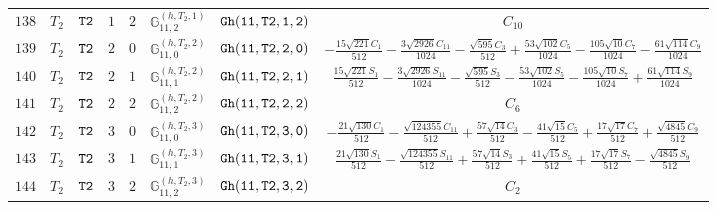 \documentclass[fleqn,8pt]{jsarticle}
\begin{document}
\begin{table}[ht!]
\begin{center}
\begin{tabular}{cccccccc}
$ 138 $ & $ T_{2} $ & $ {\tt T2} $ & $ 1 $ & $ 2 $ & $ \mathbb{G}_{11,2}^{(h,T_{2},1)} $ & $ {\tt Gh(11,T2,1,2)} $ & $ C_{10} $ \\
$ 139 $ & $ T_{2} $ & $ {\tt T2} $ & $ 2 $ & $ 0 $ & $ \mathbb{G}_{11,0}^{(h,T_{2},2)} $ & $ {\tt Gh(11,T2,2,0)} $ & $ - \frac{15 \sqrt{221} C_{1}}{512} - \frac{3 \sqrt{2926} C_{11}}{1024} - \frac{\sqrt{595} C_{3}}{512} + \frac{53 \sqrt{102} C_{5}}{1024} - \frac{105 \sqrt{10} C_{7}}{1024} - \frac{61 \sqrt{114} C_{9}}{1024} $ \\
$ 140 $ & $ T_{2} $ & $ {\tt T2} $ & $ 2 $ & $ 1 $ & $ \mathbb{G}_{11,1}^{(h,T_{2},2)} $ & $ {\tt Gh(11,T2,2,1)} $ & $ \frac{15 \sqrt{221} S_{1}}{512} - \frac{3 \sqrt{2926} S_{11}}{1024} - \frac{\sqrt{595} S_{3}}{512} - \frac{53 \sqrt{102} S_{5}}{1024} - \frac{105 \sqrt{10} S_{7}}{1024} + \frac{61 \sqrt{114} S_{9}}{1024} $ \\
$ 141 $ & $ T_{2} $ & $ {\tt T2} $ & $ 2 $ & $ 2 $ & $ \mathbb{G}_{11,2}^{(h,T_{2},2)} $ & $ {\tt Gh(11,T2,2,2)} $ & $ C_{6} $ \\
$ 142 $ & $ T_{2} $ & $ {\tt T2} $ & $ 3 $ & $ 0 $ & $ \mathbb{G}_{11,0}^{(h,T_{2},3)} $ & $ {\tt Gh(11,T2,3,0)} $ & $ - \frac{21 \sqrt{130} C_{1}}{512} - \frac{\sqrt{124355} C_{11}}{512} + \frac{57 \sqrt{14} C_{3}}{512} - \frac{41 \sqrt{15} C_{5}}{512} + \frac{17 \sqrt{17} C_{7}}{512} + \frac{\sqrt{4845} C_{9}}{512} $ \\
$ 143 $ & $ T_{2} $ & $ {\tt T2} $ & $ 3 $ & $ 1 $ & $ \mathbb{G}_{11,1}^{(h,T_{2},3)} $ & $ {\tt Gh(11,T2,3,1)} $ & $ \frac{21 \sqrt{130} S_{1}}{512} - \frac{\sqrt{124355} S_{11}}{512} + \frac{57 \sqrt{14} S_{3}}{512} + \frac{41 \sqrt{15} S_{5}}{512} + \frac{17 \sqrt{17} S_{7}}{512} - \frac{\sqrt{4845} S_{9}}{512} $ \\
$ 144 $ & $ T_{2} $ & $ {\tt T2} $ & $ 3 $ & $ 2 $ & $ \mathbb{G}_{11,2}^{(h,T_{2},3)} $ & $ {\tt Gh(11,T2,3,2)} $ & $ C_{2} $ \\
 \hline \hline
\end{tabular}
\end{center}
\end{table}
\end{document}
